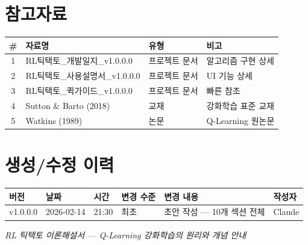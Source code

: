 \documentclass[11pt,a4paper]{article}
\begin{document}
\newpage
\section*{참고자료}

\begin{center}
\renewcommand{\arraystretch}{1.4}
\begin{tabular}{|c|l|l|l|}
\hline
\rowcolor{tableheader}
\textbf{\#} & \textbf{자료명} & \textbf{유형} & \textbf{비고} \\
\hline
1 & RL틱택토\_개발일지\_v1.0.0.0 & 프로젝트 문서 & 알고리즘 구현 상세 \\
\hline
2 & RL틱택토\_사용설명서\_v1.0.0.0 & 프로젝트 문서 & UI 기능 상세 \\
\hline
3 & RL틱택토\_퀵가이드\_v1.0.0.0 & 프로젝트 문서 & 빠른 참조 \\
\hline
4 & Sutton \& Barto (2018) & 교재 & 강화학습 표준 교재 \\
\hline
5 & Watkins (1989) & 논문 & Q-Learning 원논문 \\
\hline
\end{tabular}
\end{center}

\section*{생성/수정 이력}

\begin{center}
\renewcommand{\arraystretch}{1.3}
\begin{tabular}{|l|l|l|l|p{5.5cm}|l|}
\hline
\rowcolor{tableheader}
\textbf{버전} & \textbf{날짜} & \textbf{시간} & \textbf{변경 수준} & \textbf{변경 내용} & \textbf{작성자} \\
\hline
v1.0.0.0 & 2026-02-14 & 21:30 & 최초 & 초안 작성 — 10개 섹션 전체 & Claude \\
\hline
\end{tabular}
\end{center}

\vfill
\begin{center}
\small\color{lightbrown}
\emph{RL 틱택토 이론해설서 — Q-Learning 강화학습의 원리와 개념 안내}
\end{center}
\end{document}
